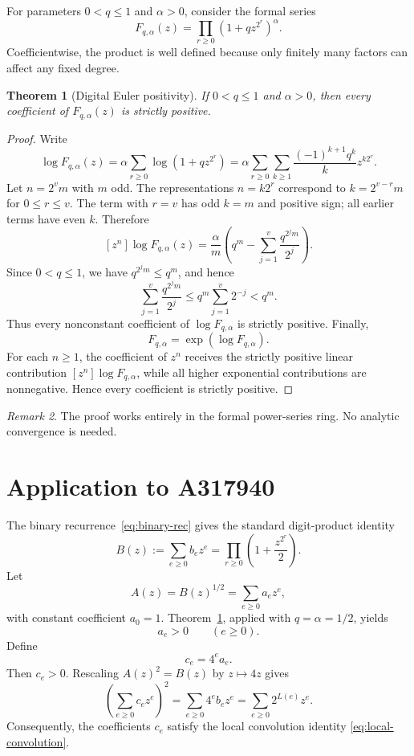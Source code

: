 \documentclass[11pt]{article}
\newtheorem{theorem}{Theorem}[section]
\theoremstyle{definition}
\theoremstyle{remark}
\newtheorem{remark}[theorem]{Remark}
\begin{document}
For parameters $0<q\le1$ and $\alpha>0$, consider the formal series
\begin{equation}\label{eq:Fqa}
  F_{q,\alpha}(z)=\prod_{r\ge0}(1+qz^{2^r})^\alpha.
\end{equation}
Coefficientwise, the product is well defined because only finitely many factors can affect any fixed degree.

\begin{theorem}[Digital Euler positivity]\label{thm:general}
If $0<q\le1$ and $\alpha>0$, then every coefficient of $F_{q,\alpha}(z)$ is strictly positive.
\end{theorem}

\begin{proof}
Write
\[
  \log F_{q,\alpha}(z)
  =\alpha\sum_{r\ge0}\log(1+qz^{2^r})
  =\alpha\sum_{r\ge0}\sum_{k\ge1}
      \frac{(-1)^{k+1}q^k}{k}z^{k2^r}.
\]
Let $n=2^vm$ with $m$ odd.  The representations $n=k2^r$ correspond to
$k=2^{v-r}m$ for $0\le r\le v$.  The term with $r=v$ has odd $k=m$ and positive sign; all earlier terms have even $k$.  Therefore
\begin{equation}\label{eq:logcoeff}
  [z^n]\log F_{q,\alpha}(z)
  =\frac{\alpha}{m}
      \left(q^m-\sum_{j=1}^{v}\frac{q^{2^jm}}{2^j}\right).
\end{equation}
Since $0<q\le1$, we have $q^{2^jm}\le q^m$, and hence
\[
  \sum_{j=1}^{v}\frac{q^{2^jm}}{2^j}
  \le q^m\sum_{j=1}^{v}2^{-j}
  <q^m.
\]
Thus every nonconstant coefficient of $\log F_{q,\alpha}$ is strictly positive.  Finally,
\[
  F_{q,\alpha}=\exp(\log F_{q,\alpha}).
\]
For each $n\ge1$, the coefficient of $z^n$ receives the strictly positive linear contribution $[z^n]\log F_{q,\alpha}$, while all higher exponential contributions are nonnegative.  Hence every coefficient is strictly positive.
\end{proof}

\begin{remark}
The proof works entirely in the formal power-series ring.  No analytic convergence is needed.
\end{remark}

\section{Application to A317940}

The binary recurrence~\eqref{eq:binary-rec} gives the standard digit-product identity
\begin{equation}\label{eq:Bproduct}
  B(z):=\sum_{e\ge0}b_ez^e
  =\prod_{r\ge0}\left(1+\frac{z^{2^r}}{2}\right).
\end{equation}
Let
\[
  A(z)=B(z)^{1/2}=\sum_{e\ge0}a_ez^e,
\]
with constant coefficient $a_0=1$.  Theorem~\ref{thm:general}, applied with
$q=\alpha=1/2$, yields
\[
  a_e>0\qquad(e\ge0).
\]
Define
\[
  c_e=4^ea_e.
\]
Then $c_e>0$.  Rescaling $A(z)^2=B(z)$ by $z\mapsto4z$ gives
\[
  \left(\sum_{e\ge0}c_ez^e\right)^2
  =\sum_{e\ge0}4^eb_ez^e
  =\sum_{e\ge0}2^{L(e)}z^e.
\]
Consequently, the coefficients $c_e$ satisfy the local convolution identity
\eqref{eq:local-convolution}.
\end{document}

